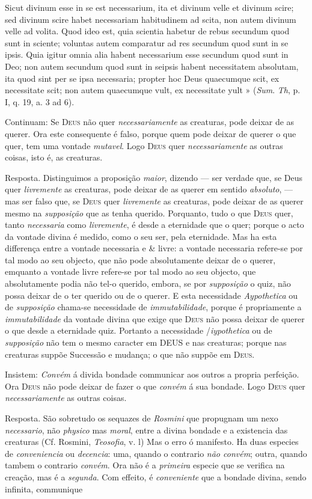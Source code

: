 Sicut divinum esse in se est necessarium, ita et divinum velle et divinum scire; sed divinum scire habet necessariam habitudinem ad scita, non autem divinum velle ad volita. Quod ideo est, quia scientia habetur de rebus secundum quod sunt in sciente; voluntas autem comparatur ad res secundum quod sunt in se ipsis. Quia igitur omnia alia habent necessarium esse secundum quod sunt in Deo; non autem secundum quod sunt in seipsis habent necessitatem absolutam, ita quod sint per se ipsa necessaria; propter hoc Deus quaecumque scit, ex necessitate scit; non autem quaecumque vult, ex necessitate yult » (\emph{Sum}. \emph{Th}, p. I, q. 19, a. 3 ad 6).\par Continuam: Se \textsc{Deus} não quer \emph{necessariamente} as creaturas, pode deixar de as querer. Ora este consequente é falso, porque quem pode deixar de querer o que quer, tem uma vontade \emph{mutavel}. Logo \textsc{Deus} quer \emph{necessariamente} as outras coisas, isto é, as creaturas.\par Resposta. Distinguimos a proposição \emph{maior}, dizendo --- ser verdade que, se Deus quer \emph{livremente} as creaturas, pode deixar de as querer em sentido \emph{absoluto}, --- mas ser falso que, se \textsc{Deus} quer \emph{livremente} as creaturas, pode deixar de as querer mesmo na \emph{supposição} que as tenha querido. Porquanto, tudo o que \textsc{Deus} quer, tanto \emph{necessaria} como \emph{livremente}, é desde a eternidade que o quer; porque o acto da vontade divina é medido, como o seu ser, pela eternidade. Mas ha esta differença entre a vontade necessaria e \& livre: a vontade necessaria refere-se por tal modo ao seu objecto, que não pode absolutamente deixar de o querer, emquanto a vontade livre refere-se por tal modo ao seu objecto, que absolutamente podia não tel-o querido, embora, se por \emph{supposição} o quiz, não possa deixar de o ter querido ou de o querer. E esta necessidade \emph{Aypothetica} ou de \emph{supposição} chama-se necessidade de \emph{immutabilidade}, porque é propriamente a \emph{immutabilidade} da vontade divina que exige que \textsc{Deus} não possa deixar de querer o que desde a eternidade quiz. Portanto a necessidade /\emph{iypothetica} ou de \emph{supposição} não tem o mesmo caracter em \textsc{DEUS} e nas creaturas; porque nas creaturas suppõe Successão e mudança; o que não suppõe em \textsc{Deus}.\par Insistem: \emph{Convém} á divida bondade communicar aos outros a propria perfeição. Ora \textsc{Deus} não pode deixar de fazer o que \emph{convém} á sua bondade. Logo \textsc{Deus} quer \emph{necessariamente} as outras coisas.\par Resposta. São sobretudo os sequazes de \emph{Rosmini} que propugnam um nexo \emph{necessario}, não \emph{physico} mas \emph{moral}, entre a divina bondade e a existencia das creaturas (Cf. Rosmini, \emph{Teosofia}, v. l) Mas o erro ó manifesto. Ha duas especies de \emph{conveniencia} ou \emph{decencia}: uma, quando o contrario \emph{não convém}; outra, quando tambem o contrario \emph{convém}. Ora não é a \emph{primeira} especie que se verifica na creação, mas é a \emph{segunda}. Com effeito, é \emph{conveniente} que a bondade divina, sendo infinita, communique 